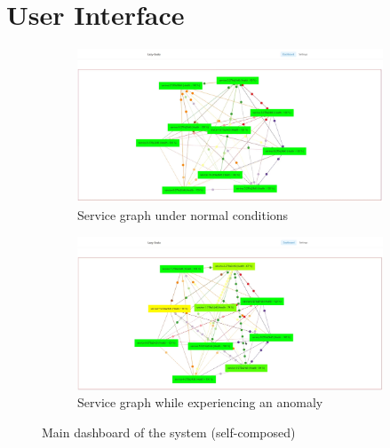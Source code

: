 \chapter{User Interface}\label{appendix:ui}

\begin{figure}[H]
    \centering
    \begin{subfigure}[b]{1\textwidth}
        \centering
        \includegraphics[width=\textwidth]{assets/appendix/before-anomly.png}
        \caption{Service graph under normal conditions}
    \end{subfigure}
    \hfill
    \begin{subfigure}[b]{1\textwidth}
        \centering
        \includegraphics[width=\textwidth]{assets/appendix/after-anomly.png}
        \caption{Service graph while experiencing an anomaly}
    \end{subfigure}
    \hfill
    \caption{Main dashboard of the system (self-composed)}
\end{figure}